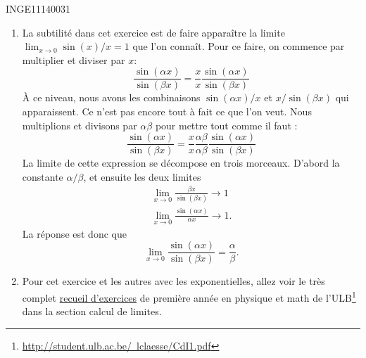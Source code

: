 \documentclass{article}
\begin{document}
\begin{corrige}{INGE11140031}
\begin{enumerate}
		\item
			La subtilité dans cet exercice est de faire apparaître la limite $\lim_{x\to 0} \sin(x)/x=1$ que l'on connaît. Pour ce faire, on commence par multiplier et diviser par $x$:
			\begin{equation}
				\frac{ \sin(\alpha x) }{ \sin(\beta x) }=\frac{ x }{ x } \frac{ \sin(\alpha x) }{ \sin(\beta x) }
			\end{equation}
			À ce niveau, nous avons les combinaisons $\sin(\alpha x)/x$ et $x/\sin(\beta x)$ qui apparaissent. Ce n'est pas encore tout à fait ce que l'on veut. Nous multiplions et divisons par $\alpha\beta$ pour mettre tout comme il faut :
			\begin{equation}
				\frac{ \sin(\alpha x) }{ \sin(\beta x) }=\frac{ x }{ x } \frac{ \alpha\beta }{ \alpha\beta }\frac{ \sin(\alpha x) }{ \sin(\beta x) }
			\end{equation}
			La limite de cette expression se décompose en trois morceaux. D'abord la constante $\alpha/\beta$, et ensuite les deux limites
			\begin{subequations}
				\begin{align}
					\lim_{x\to 0} \frac{ \beta x }{ \sin(\beta x) }\to 1\\
					\lim_{x\to 0} \frac{\sin(\alpha x)}{ \alpha x }\to 1.
				\end{align}
			\end{subequations}
			La réponse est donc que
			\begin{equation}
				\lim_{x\to 0} \frac{ \sin(\alpha x) }{ \sin(\beta x) }=\frac{ \alpha }{ \beta }.
			\end{equation}

		\item
			Pour cet exercice et les autres avec les exponentielles, allez voir le très complet \href{http://student.ulb.ac.be/~lclaesse/CdI1.pdf}{recueil d'exercices} de première année en physique et math de l'ULB\footnote{\href{http://student.ulb.ac.be/~lclaesse/CdI1.pdf}{http://student.ulb.ac.be/~lclaesse/CdI1.pdf}} dans la section \og calcul de limites\fg. 
		

\end{enumerate}
\end{corrige}
\end{document}
